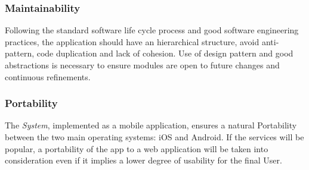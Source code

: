\documentclass {article}
\begin{document}
	\subsubsection{Maintainability}
	Following the standard software life cycle process and good software engineering practices, the application should have an hierarchical structure, avoid anti-pattern, code duplication and lack of cohesion. Use of design pattern and good abstractions is necessary to ensure modules are open to future changes and continuous refinements. 
	\subsubsection{Portability}
	The {\it System}, implemented as a mobile application, ensures a natural Portability between the two main operating systems: iOS and Android. If the services will be popular, a portability of the app to a web application will be taken into consideration even if it implies a lower degree of usability for the final User.
	
\pagebreak


\end{document}
